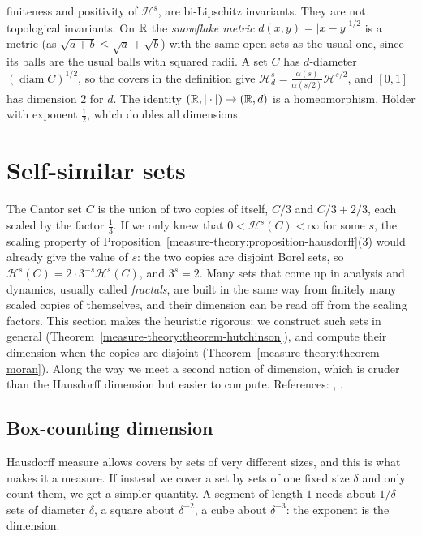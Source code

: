 \begin{example}
\begin{enumerate}
finiteness and positivity of $\mathcal{H}^s$, are bi-Lipschitz invariants. They are not topological invariants. On $\mathbb{R}$ the \emph{snowflake metric} $d(x, y) = |x - y|^{1/2}$ is a metric (as
$\sqrt{a + b} \leq \sqrt a + \sqrt b$) with the same open sets as the usual one, since its balls are the usual balls with squared radii. A set $C$ has $d$-diameter $(\operatorname{diam}C)^{1/2}$, so the covers in the
definition give $\mathcal{H}^s_d = \frac{\alpha(s)}{\alpha(s/2)}\mathcal{H}^{s/2}$, and $[0, 1]$ has dimension $2$ for $d$. The identity $(\mathbb{R}, |\cdot|) \to (\mathbb{R}, d)$ is a homeomorphism, H\"older with
exponent $\frac12$, which doubles all dimensions.
\end{enumerate}
\end{example}

\section{Self-similar sets}\label{measure-theory:section-self-similar}

The Cantor set $C$ is the union of two copies of itself, $C/3$ and $C/3 + 2/3$, each scaled by the factor $\frac13$. If we only knew that $0 < \mathcal{H}^s(C) < \infty$ for some $s$, the scaling property
of Proposition~\ref{measure-theory:proposition-hausdorff}(3) would already give the value of $s$: the two copies are disjoint Borel sets, so
$\mathcal{H}^s(C) = 2 \cdot 3^{-s}\mathcal{H}^s(C)$, and $3^s = 2$. Many sets that come up in analysis and dynamics, usually called \emph{fractals}, are built in the same way from finitely many
scaled copies of themselves, and their dimension can be read off from the scaling factors. This section makes the heuristic rigorous: we construct such sets in general
(Theorem~\ref{measure-theory:theorem-hutchinson}), and compute their dimension when the copies are disjoint (Theorem~\ref{measure-theory:theorem-moran}). Along the way we meet a second notion of
dimension, which is cruder than the Hausdorff dimension but easier to compute. References: \cite{falconer-fractal}, \cite{hutchinson-1981}.

\subsection{Box-counting dimension}\label{measure-theory:subsection-box-dimension}

Hausdorff measure allows covers by sets of very different sizes, and this is what makes it a measure. If instead we cover a set by sets of one fixed size $\delta$ and only count them, we get a
simpler quantity. A segment of length $1$ needs about $1/\delta$ sets of diameter $\delta$, a square about $\delta^{-2}$, a cube about $\delta^{-3}$: the exponent is the dimension.

